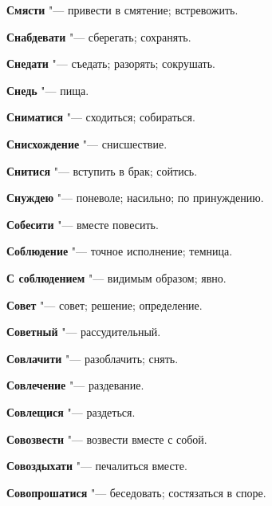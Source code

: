 \begin{mymulticols}{2}
\noindent\textbf{Смясти} "--- привести в смятение; встревожить. 




\noindent\textbf{Снабдевати} "--- сберегать; сохранять. 




\noindent\textbf{Снедати} "--- съедать; разорять; сокрушать. 




\noindent\textbf{Снедь} "--- пища. 




\noindent\textbf{Сниматися} "--- сходиться; собираться. 




\noindent\textbf{Снисхождение} "--- снисшествие. 




\noindent\textbf{Снитися} "--- вступить в брак; сойтись. 




\noindent\textbf{Снуждею} "--- поневоле; насильно; по принуждению. 




\noindent\textbf{Собесити} "--- вместе повесить. 




\noindent\textbf{Соблюдение} "--- точное исполнение; темница. 




\noindent\textbf{С соблюдением} "--- видимым образом; явно. 




\noindent\textbf{Совет} "--- совет; решение; определение. 




\noindent\textbf{Советный} "--- рассудительный. 




\noindent\textbf{Совлачити} "--- разоблачить; снять. 




\noindent\textbf{Совлечение} "--- раздевание. 




\noindent\textbf{Совлещися} "--- раздеться. 




\noindent\textbf{Совозвести} "--- возвести вместе с собой. 




\noindent\textbf{Совоздыхати} "--- печалиться вместе. 




\noindent\textbf{Совопрошатися} "--- беседовать; состязаться в споре. 





\end{mymulticols}
